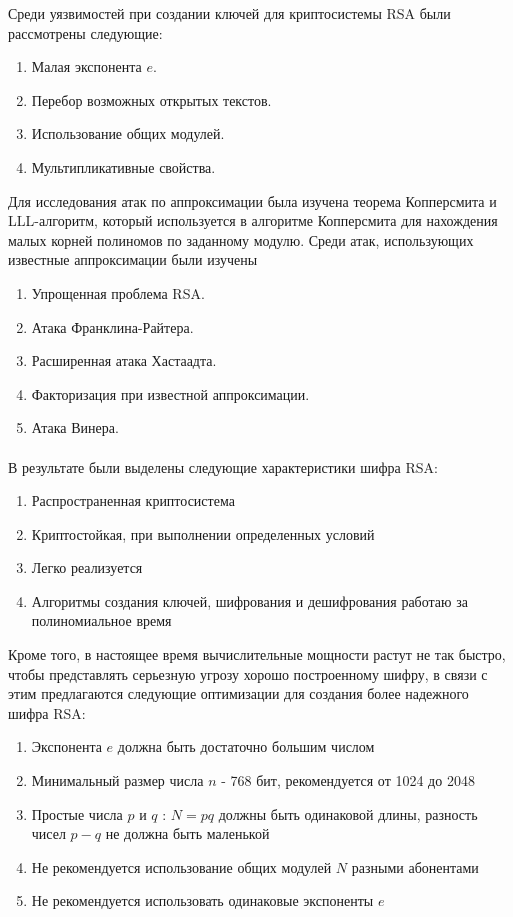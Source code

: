 	Среди уязвимостей при создании ключей для криптосистемы RSA были рассмотрены следующие:
		\begin{enumerate}
			\item Малая экспонента $e$.
			\item Перебор возможных открытых текстов.
			\item Использование общих модулей.
			\item Мультипликативные свойства.
		\end{enumerate}

	Для исследования атак по аппроксимации была изучена теорема Копперсмита и LLL-алгоритм, который используется в алгоритме Копперсмита для нахождения малых корней полиномов по заданному модулю. Среди атак, использующих известные аппроксимации были изучены
		\begin{enumerate}
			\item Упрощенная проблема RSA.
			\item Атака Франклина-Райтера.
			\item Расширенная атака Хастаадта.
			\item Факторизация при известной аппроксимации.
			\item Атака Винера.
		\end{enumerate}

	\paragraph{} В результате были выделены следующие характеристики шифра RSA:

		\begin{enumerate}
			\item Распространенная криптосистема
			\item Криптостойкая, при выполнении определенных условий
			\item Легко реализуется
			\item Алгоритмы создания ключей, шифрования и дешифрования работаю за полиномиальное время
		\end{enumerate}	

	Кроме того, в настоящее время вычислительные мощности растут не так быстро, чтобы представлять серьезную угрозу хорошо построенному шифру, в связи с этим предлагаются следующие оптимизации для создания более надежного шифра RSA:
	
		\begin{enumerate}
			\item Экспонента $e$ должна быть достаточно большим числом
			\item Минимальный размер числа $n$ - 768 бит, рекомендуется от 1024 до 2048
			\item Простые числа $p$ и $q$ : $N=pq$ должны быть одинаковой длины, разность чисел $p - q$ не должна быть маленькой
			\item Не рекомендуется использование общих модулей $N$ разными абонентами
			\item Не рекомендуется использовать одинаковые экспоненты $e$
		\end{enumerate}


